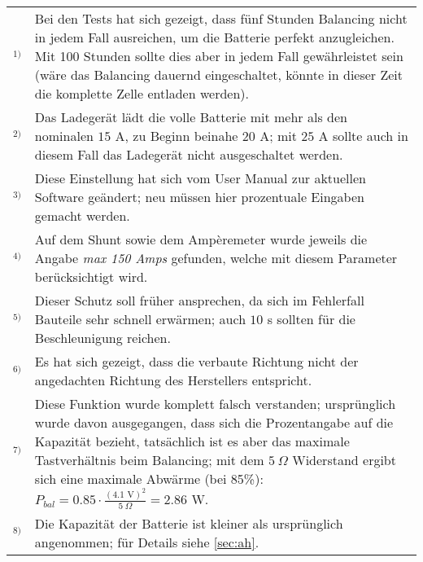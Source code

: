 \begin{tabular}{p{1cm}p{15cm}}
$^{1)}$ & Bei den Tests hat sich gezeigt, dass fünf Stunden Balancing nicht in jedem Fall ausreichen, um die Batterie perfekt anzugleichen. Mit 100 Stunden sollte dies aber in jedem Fall gewährleistet sein (wäre das Balancing dauernd eingeschaltet, könnte in dieser Zeit die komplette Zelle entladen werden).\\[6pt]

$^{2)}$ & Das Ladegerät lädt die volle Batterie mit mehr als den nominalen $15$ A, zu Beginn beinahe $20$ A; mit $25$ A sollte auch in diesem Fall das Ladegerät nicht ausgeschaltet werden.\\[6pt]

$^{3)}$ & Diese Einstellung hat sich vom User Manual zur aktuellen Software geändert; neu müssen hier prozentuale Eingaben gemacht werden.\\[6pt]

$^{4)}$ & Auf dem Shunt sowie dem Ampèremeter wurde jeweils die Angabe \textit{max 150 Amps} gefunden, welche mit diesem Parameter berücksichtigt wird.\\[6pt]

$^{5)}$ & Dieser Schutz soll früher ansprechen, da sich im Fehlerfall Bauteile sehr schnell erwärmen; auch $10$ s sollten für die Beschleunigung reichen.\\[6pt]

$^{6)}$ & Es hat sich gezeigt, dass die verbaute Richtung nicht der angedachten Richtung des Herstellers entspricht.\\[6pt]

$^{7)}$ & Diese Funktion wurde komplett falsch verstanden; ursprünglich wurde davon ausgegangen, dass sich die Prozentangabe auf die Kapazität bezieht, tatsächlich ist es aber das maximale Tastverhältnis beim Balancing; mit dem $5\ \Omega$ Widerstand ergibt sich eine maximale Abwärme (bei 85\%): $P_{bal}=0.85\cdot\frac{\left(4.1\text{ V}\right)^2}{5\ \Omega}=2.86$ W.\\[6pt]

$^{8)}$ & Die Kapazität der Batterie ist kleiner als ursprünglich angenommen; für Details siehe \ref{sec:ah}.
\end{tabular}